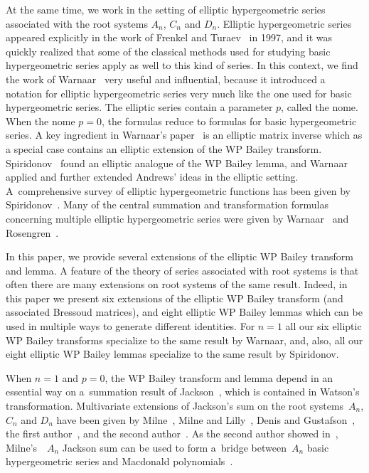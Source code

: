 \documentclass[pdftex]{sigma}
\numberwithin{equation}{section}
\begin{document}
At the same time, we work in the setting of elliptic hypergeometric series associated with the root systems $A_n$, $C_n$ and $D_n$. Elliptic hypergeometric series appeared explicitly in the work of Frenkel and Turaev~\cite{FT1997} in 1997, and it was quickly realized that some of the classical methods used for studying basic hypergeometric series apply as well to this kind of series. In this context, we find the work of Warnaar~\cite{SOW2002} very useful and influential, because it introduced a notation for elliptic hypergeometric series very much like the one used for basic hypergeometric series. The elliptic series contain a parameter $p$, called the nome. When the nome $p=0$, the formulas reduce to formulas for basic hypergeometric series. A key ingredient in Warnaar's paper~\cite{SOW2002} is an elliptic matrix inverse which as a special case contains an elliptic extension of the WP Bailey transform. Spiridonov~\cite{VPS2002} found an elliptic analogue of the WP Bailey lemma, and Warnaar~\cite{SOW2003} applied and further extended Andrews' ideas in the elliptic setting. A~comprehensive survey of elliptic hypergeometric functions has been given by Spiridonov~\cite{VPS2008}. Many of the central summation and transformation formulas concerning multiple elliptic hypergeometric series were given by Warnaar~\cite{SOW2002} and Rosengren~\cite{HR2004}.

In this paper, we provide several extensions of the elliptic WP Bailey transform and lemma. A feature of the theory of series associated with root systems is that often there are many extensions on root systems of the same result. Indeed, in this paper we present six extensions of the elliptic WP Bailey transform (and associated Bressoud matrices), and eight elliptic WP Bailey lemmas which can be used in multiple ways to generate different identities. For $n=1$ all our six elliptic WP Bailey transforms specialize to the same result by Warnaar, and, also, all our eight elliptic WP Bailey lemmas specialize to the same result by Spiridonov.

When $n=1$ and $p=0$, the WP Bailey transform and lemma depend in an essential way on a~summation result of Jackson~\cite{Jackson1921}, which is contained in Watson's transformation. Multivariate extensions of Jackson's sum on the root systems~$A_n$, $C_n$ and $D_n$ have been given by Milne~\cite{Milne1988}, Milne and Lilly~\cite{ML1995}, Denis and Gustafson~\cite{DG1992}, the first author~\cite{GB1999a}, and the second author~\cite{MS1997,MS2008}. As the second author showed in~\cite{MS2007b}, Milne's~\cite{Milne1988}~$A_n$ Jackson sum can be used to form a~bridge between~$A_n$ basic hypergeometric series and Macdonald polynomials~\cite[Chapter~VI]{Mac1995}.
\end{document}
